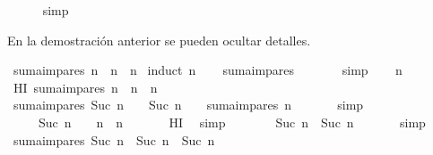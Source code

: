 \begin{isabellebody}
\ \ \ \ \isamarkupfalse%
\ simp\isanewline
{}\isamarkupfalse%
%
\endisatagproof
{\isafoldproof}%
%
\isadelimproof
%
\endisadelimproof
%
\begin{isamarkuptext}%
En la demostración anterior se pueden ocultar detalles.%
\end{isamarkuptext}\isamarkuptrue%
\isamarkupfalse%
\ {\isachardoublequoteopen}suma{\isacharunderscore}impares\ n\ {\isacharequal}\ n\ {\isacharasterisk}\ n{\isachardoublequoteclose}\isanewline
%
\isadelimproof
%
\endisadelimproof
%
\isatagproof
{}\isamarkupfalse%
\ {\isacharparenleft}induct\ n{\isacharparenright}\isanewline
\ \ \isamarkupfalse%
\ {\isachardoublequoteopen}suma{\isacharunderscore}impares\ {}\ {\isacharequal}\ {}\ {\isacharasterisk}\ {}{\isachardoublequoteclose}\ \isamarkupfalse%
\ simp\isanewline
{}\isamarkupfalse%
\isanewline
\ \ \isamarkupfalse%
\ n\ \isanewline
\ \ \isamarkupfalse%
\ HI{\isacharcolon}\ {\isachardoublequoteopen}suma{\isacharunderscore}impares\ n\ {\isacharequal}\ n\ {\isacharasterisk}\ n{\isachardoublequoteclose}\isanewline
\ \ \isamarkupfalse%
\ {\isachardoublequoteopen}suma{\isacharunderscore}impares\ {\isacharparenleft}Suc\ n{\isacharparenright}\ {\isacharequal}\ {\isacharparenleft}{}\ {\isacharasterisk}\ {\isacharparenleft}Suc\ n{\isacharparenright}\ {\isacharminus}\ {}{\isacharparenright}\ {\isacharplus}\ suma{\isacharunderscore}impares\ n{\isachardoublequoteclose}\ \isanewline
\ \ \ \ \isamarkupfalse%
\ simp\isanewline
\ \ \isamarkupfalse%
\ \isamarkupfalse%
\ {\isachardoublequoteopen}{\isasymdots}\ {\isacharequal}\ {\isacharparenleft}{}\ {\isacharasterisk}\ {\isacharparenleft}Suc\ n{\isacharparenright}\ {\isacharminus}\ {}{\isacharparenright}\ {\isacharplus}\ n\ {\isacharasterisk}\ n{\isachardoublequoteclose}\ \isanewline
\ \ \ \ \isamarkupfalse%
\ HI\ \isamarkupfalse%
\ simp\isanewline
\ \ \isamarkupfalse%
\ \isamarkupfalse%
\ {\isachardoublequoteopen}{\isasymdots}\ {\isacharequal}\ {\isacharparenleft}Suc\ n{\isacharparenright}\ {\isacharasterisk}\ {\isacharparenleft}Suc\ n{\isacharparenright}{\isachardoublequoteclose}\ \isanewline
\ \ \ \ \isamarkupfalse%
\ simp\isanewline
\ \ \isamarkupfalse%
\ \isamarkupfalse%
\ {\isachardoublequoteopen}suma{\isacharunderscore}impares\ {\isacharparenleft}Suc\ n{\isacharparenright}\ {\isacharequal}\ {\isacharparenleft}Suc\ n{\isacharparenright}\ {\isacharasterisk}\ {\isacharparenleft}Suc\ n{\isacharparenright}{\isachardoublequoteclose}\ \isanewline

\end{isabellebody}
